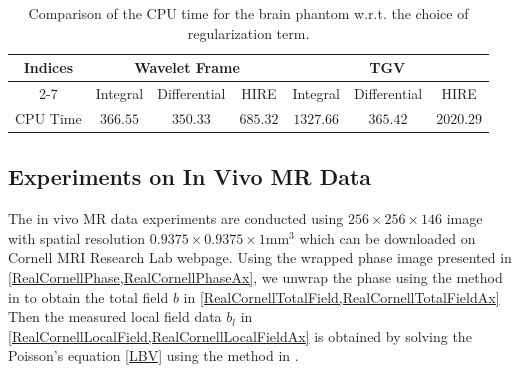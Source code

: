\documentclass[reqno]{siamonline1116}
\numberwithin{theorem}{section}
\numberwithin{equation}{section}
\begin{document}
\begin{table}
\centering
\caption{Comparison of the CPU time for the brain phantom w.r.t. the choice of regularization term.}\label{ComparisonTimePhantom}
\vspace{-0.20cm}
\begin{tabular}{|c||c|c|c|c|c|c|}
\hline
\multirow{2}{*}{Indices}&\multicolumn{3}{|c|}{Wavelet Frame}&\multicolumn{3}{|c|}{TGV}\\ \cline{2-7}
&Integral&Differential&HIRE&Integral&Differential&HIRE\\ \hline
CPU Time&$366.55$&$350.33$&$685.32$&$1327.66$&$365.42$&$2020.29$\\ \hline
\end{tabular}
\end{table}

%
%

\subsection{Experiments on In Vivo MR Data}\label{RealMRData}

The in vivo MR data experiments are conducted using $256\times256\times146$ image with spatial resolution $0.9375\times0.9375\times1\mathrm{mm}^3$ which can be downloaded on Cornell MRI Research Lab webpage. Using the wrapped phase image presented in \cref{RealCornellPhase,RealCornellPhaseAx}, we unwrap the phase using the method in \cite{D.C.Ghiglia1998} to obtain the total field $b$ in \cref{RealCornellTotalField,RealCornellTotalFieldAx} Then the measured local field data $b_l$ in \cref{RealCornellLocalField,RealCornellLocalFieldAx} is obtained by solving the Poisson's equation \cref{LBV} using the method in \cite{D.Zhou2014}.
\end{document}
